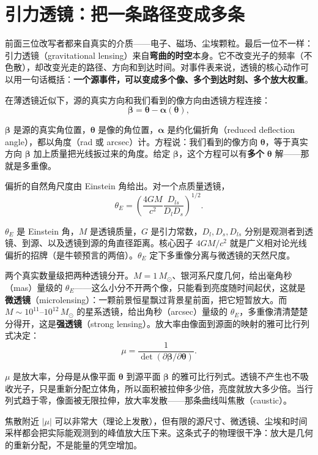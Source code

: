 \section{引力透镜：把一条路径变成多条}
\label{sec:e21-lensing}

前面三位改写者都来自真实的介质——电子、磁场、尘埃颗粒。最后一位不一样：引力透镜（gravitational lensing）来自\textbf{弯曲的时空}本身。它不改变光子的频率（不色散），却改变光走的路径、方向和到达时间。对事件表来说，透镜的核心动作可以用一句话概括：\textbf{一个源事件，可以变成多个像、多个到达时刻、多个放大权重}。

在薄透镜近似下，源的真实方向和我们看到的像方向由透镜方程连接：
\begin{equation}
  {\boldsymbol\beta}
  =
  {\boldsymbol\theta}
  -
  {\boldsymbol\alpha}({\boldsymbol\theta}),
  \label{eq:e21-lens-equation}
\end{equation}
\begin{formulaexplain}
\({\boldsymbol\beta}\) 是源的真实角位置，\({\boldsymbol\theta}\) 是像的角位置，\({\boldsymbol\alpha}\) 是约化偏折角（reduced deflection angle），都以角度（rad 或 arcsec）计。方程说：我们看到的像方向 \({\boldsymbol\theta}\)，等于真实方向 \({\boldsymbol\beta}\) 加上质量把光线扳过来的角度。给定 \({\boldsymbol\beta}\)，这个方程可以有\textbf{多个} \({\boldsymbol\theta}\) 解——那就是多重像。
\end{formulaexplain}
偏折的自然角尺度由 Einstein 角给出。对一个点质量透镜，
\begin{equation}
  \theta_E
  =
  \left(
  \frac{4GM}{c^2}
  \frac{D_{ls}}{D_lD_s}
  \right)^{1/2}.
  \label{eq:e21-einstein-angle}
\end{equation}
\begin{formulaexplain}
\(\theta_E\) 是 Einstein 角，\(M\) 是透镜质量，\(G\) 是引力常数，\(D_l,D_s,D_{ls}\) 分别是观测者到透镜、到源、以及透镜到源的角直径距离。核心因子 \(4GM/c^2\) 就是广义相对论光线偏折的招牌（是牛顿预言的两倍）。\(\theta_E\) 定下多重像分离与微透镜的天然尺度。
\end{formulaexplain}
两个真实数量级把两种透镜分开。\(M=1\,M_\odot\)、银河系尺度几何，给出毫角秒（mas）量级的 \(\theta_E\)——这么小分不开两个像，只能看到亮度随时间起伏，这就是\textbf{微透镜}（microlensing）：一颗前景恒星飘过背景星前面，把它短暂放大。而 \(M\sim10^{11}\text{--}10^{12}\,M_\odot\) 的星系透镜，给出角秒（arcsec）量级的 \(\theta_E\)，多重像清清楚楚分得开，这是\textbf{强透镜}（strong lensing）。放大率由像面到源面的映射的雅可比行列式决定：
\begin{equation}
  \mu
  =
  \frac{1}{\det\!\left(\partial{\boldsymbol\beta}/\partial{\boldsymbol\theta}\right)}.
  \label{eq:e21-magnification}
\end{equation}
\begin{formulaexplain}
\(\mu\) 是放大率，分母是从像平面 \({\boldsymbol\theta}\) 到源平面 \({\boldsymbol\beta}\) 的雅可比行列式。透镜不产生也不吸收光子，只是重新分配立体角，所以面积被拉伸多少倍，亮度就放大多少倍。当行列式趋于零，像面被无限拉伸，放大率发散——那条曲线叫焦散（caustic）。
\end{formulaexplain}
焦散附近 \(|\mu|\) 可以非常大（理论上发散），但有限的源尺寸、微透镜、尘埃和时间采样都会把实际能观测到的峰值放大压下来。这条式子的物理很干净：放大是几何的重新分配，不是能量的凭空增加。

